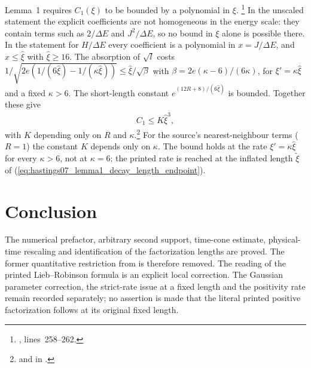 \documentclass{article}
\begin{document}
Lemma~1 requires $C_1(\xi)$ to be bounded by a polynomial in $\xi$.
\footnote{, lines~258--262.}
In the unscaled statement the explicit coefficients are not homogeneous in
the energy scale: they contain terms such as $2/\Delta E$ and
$J^2/\Delta E$, so no bound in $\xi$ alone is possible there. In the
statement for $H/\Delta E$ every coefficient is a polynomial in
$x=J/\Delta E$, and $x\le\hat\xi$ with $\hat\xi\ge16$. The absorption of
$\sqrt l$ costs
$1/\sqrt{2e(1/(6\hat\xi)-1/(\kappa\hat\xi))}\le\hat\xi/\sqrt\beta$ with
$\beta=2e(\kappa-6)/(6\kappa)$, for $\xi'=\kappa\hat\xi$ and a fixed
$\kappa>6$. The short-length constant $e^{(12R+8)/(6\hat\xi)}$ is bounded.
Together these give
\begin{align}
    C_1\le K\hat\xi^3,
    \label{eq:hastings07_lemma1_decay_length_polynomial}
\end{align}
with $K$ depending only on $R$ and $\kappa$.\footnote{
    and  in
    .}
For the source's nearest-neighbour terms ($R=1$) the constant $K$ depends
only on $\kappa$. The bound holds at the rate $\xi'=\kappa\hat\xi$ for
every $\kappa>6$, not at $\kappa=6$; the printed rate is reached at the
inflated length $\tilde\xi$ of (\ref{eq:hastings07_lemma1_decay_length_endpoint}).

\section{Conclusion}

The numerical prefactor, arbitrary second support, time-cone estimate,
physical-time rescaling and identification of the factorization lengths
are proved. The former quantitative restriction from  is
therefore removed. The reading of the printed Lieb--Robinson formula is
an explicit local correction. The Gaussian parameter correction, the
strict-rate issue at a fixed length and the positivity rate remain
recorded separately; no assertion is made that the literal printed
positive factorization follows at its original fixed length.



\end{document}
